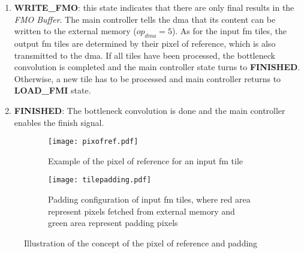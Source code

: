 \begin{enumerate}
    \item \textbf{WRITE\_FMO}: this state indicates that there are only final results in the \textit{FMO Buffer}. The main controller tells the \acrshort{dma} that its content can be written to the external memory ($op_{dma} = 5$). As for the input \acrshort{fm} tiles, the output \acrshort{fm} tiles are determined by their pixel of reference, which is also transmitted to the \acrshort{dma}. If all tiles have been processed, the bottleneck convolution is completed and the main controller state turns to \textbf{FINISHED}. Otherwise, a new tile has to be processed and main controller returns to \textbf{LOAD\_FMI} state.
    \item \textbf{FINISHED}: The bottleneck convolution is done and the main controller enables the finish signal.
\end{enumerate}
%
\begin{figure}[H]
    \centering
    \begin{subfigure}[t]{.49\textwidth}
        \centering
        \texttt{[image: pixofref.pdf]}
        \caption{Example of the pixel of reference for an input \acrshort{fm} tile}
        \label{fig:pix_of_ref}
    \end{subfigure}
    \begin{subfigure}[t]{.49\textwidth}
        \centering
        \texttt{[image: tilepadding.pdf]}
        \caption{Padding configuration of input \acrshort{fm} tiles, where red area represent pixels fetched from external memory and green area represent padding pixels}
        \label{fig:tile_padding}
    \end{subfigure}
    \caption{Illustration of the concept of the pixel of reference and padding}
\end{figure}
%
